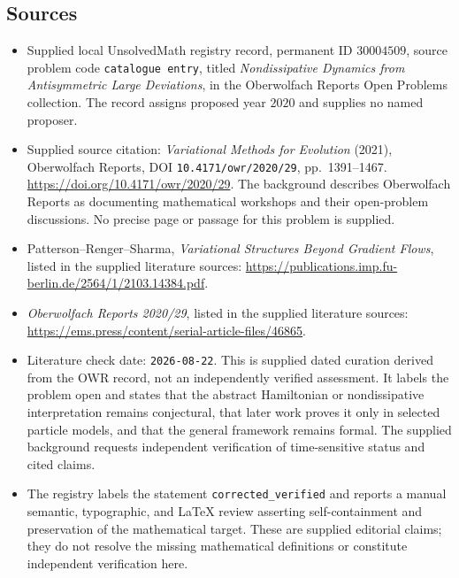 \documentclass[11pt]{article}
\begin{document}
\subsection{Sources}
\begin{itemize}
\item Supplied local UnsolvedMath registry record, permanent ID \(30004509\), source problem code \texttt{catalogue entry}, titled \emph{Nondissipative Dynamics from Antisymmetric Large Deviations}, in the Oberwolfach Reports Open Problems collection. The record assigns proposed year \(2020\) and supplies no named proposer.
\item Supplied source citation: \emph{Variational Methods for Evolution} (2021), Oberwolfach Reports, DOI \texttt{10.4171/owr/2020/29}, pp.\ 1391--1467. \url{https://doi.org/10.4171/owr/2020/29}. The background describes Oberwolfach Reports as documenting mathematical workshops and their open-problem discussions. No precise page or passage for this problem is supplied.
\item Patterson--Renger--Sharma, \emph{Variational Structures Beyond Gradient Flows}, listed in the supplied literature sources: \url{https://publications.imp.fu-berlin.de/2564/1/2103.14384.pdf}.
\item \emph{Oberwolfach Reports 2020/29}, listed in the supplied literature sources: \url{https://ems.press/content/serial-article-files/46865}.
\item Literature check date: \texttt{2026-08-22}. This is supplied dated curation derived from the OWR record, not an independently verified assessment. It labels the problem open and states that the abstract Hamiltonian or nondissipative interpretation remains conjectural, that later work proves it only in selected particle models, and that the general framework remains formal. The supplied background requests independent verification of time-sensitive status and cited claims.
\item The registry labels the statement \texttt{corrected\_verified} and reports a manual semantic, typographic, and LaTeX review asserting self-containment and preservation of the mathematical target. These are supplied editorial claims; they do not resolve the missing mathematical definitions or constitute independent verification here.
\end{itemize}
\end{document}
